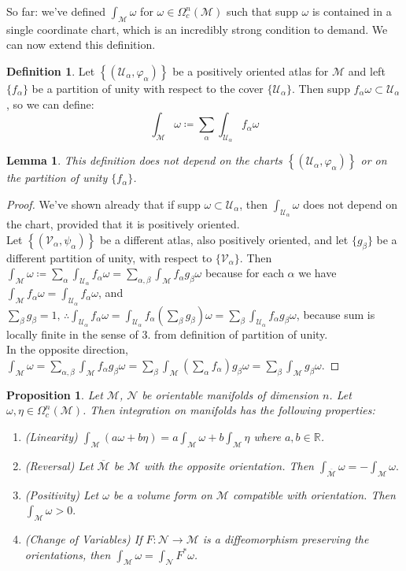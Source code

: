 \documentclass[10pt]{article}
\theoremstyle{plain}
\newtheorem{lemma}[thm]{Lemma}
\newtheorem{prop}[thm]{Proposition}
\theoremstyle{definition}
\newtheorem{defn}[thm]{Definition} %
\newcommand{\Real}{\mathbb{R}}
\newcommand{\man}{\mathcal{M}}
\newcommand{\nan}{\mathcal{N}}
\newcommand{\chartU}{\mathcal{U}}
\newcommand{\chartV}{\mathcal{V}}
\newcommand{\chart}{\varphi}
\newcommand{\varchart}{\psi}
\newcommand{\alphaatlas}{\left\{(\chartU_\alpha,\chart_\alpha)\right\}}
\newcommand{\varalphaatlas}{\left\{(\chartV_\alpha,\varchart_\alpha)\right\}}
\newcommand{\compactpformman}[1]{\Omega^{#1}_c(\man)}
\newcommand{\sumfromto}[2]{\sum\limits_{#1}^{#2}}
\begin{document}
So far: we've defined $\int_\man \omega$ for $\omega \in \compactpformman{n}$ such that supp $\omega$ is contained in a single coordinate chart, which is an incredibly strong condition to demand. We can now extend this definition.
\begin{defn}
Let $\alphaatlas$ be a positively oriented atlas for $\man$ and left $\{f_\alpha\}$ be a partition of unity with respect to the cover $\{\chartU_\alpha\}$. Then supp $f_\alpha \omega \subset  \chartU_\alpha$, so we can define:
$$\int_\man \omega \coloneqq \sumfromto{\alpha}{} \int_{\chartU_\alpha} f_\alpha \omega$$
\end{defn}
\begin{lemma}
This definition does not depend on the charts $\alphaatlas$ or on the partition of unity $\{f_\alpha\}$.
\end{lemma}
\begin{proof}
We've shown already that if supp $\omega \subset \chartU_\alpha$, then $\int_{\chartU_\alpha} \omega$ does not depend on the chart, provided that it is positively oriented. \\
Let $\varalphaatlas$ be a different atlas, also positively oriented, and let $\{g_\beta\}$ be a different partition of unity, with respect to $\{\chartV_\alpha\}$. Then $\int_\man \omega \coloneqq \sumfromto{\alpha}{} \int_{\chartU_\alpha} f_\alpha \omega = \sumfromto{\alpha,\beta}{} \int_{\man} f_\alpha g_\beta \omega$ because for each $\alpha$ we have $\int_\man f_\alpha \omega = \int_{\chartU_\alpha}f_\alpha \omega$, and $\sumfromto{\beta}{} g_\beta = 1, \,\therefore  \int_{\chartU_\alpha}f_\alpha \omega =  \int_{\chartU_\alpha}f_\alpha (\sumfromto{\beta}{}g_\beta)\omega = \sumfromto{\beta}{}\int_{\chartU_\alpha}f_\alpha g_\beta \omega$, because sum is locally finite in the sense of 3. from definition of partition of unity.\\
In the opposite direction, $\int_\man \omega = \sumfromto{\alpha,\beta}{~}  \int_\man f_\alpha g_\beta \omega = \sumfromto{\beta}{} \int_\man (\sumfromto{\alpha}{}f_\alpha )g_\beta \omega = \sumfromto{\beta}{}\int_\man g_\beta \omega$.
\end{proof}
\begin{prop}
Let $\man$, $\nan$ be orientable manifolds of dimension $n$. Let $\omega, \eta \in \compactpformman{n}$. Then integration on manifolds has the following properties:
\begin{enumerate}
    \item (Linearity) $\int_\man (a \omega + b\eta) = a \int_\man \omega  + b \int_\man \eta$ where $a,b \in \Real$.
    \item (Reversal) Let $\overline{\man}$ be $\man$ with the opposite orientation. Then $\int_{\overline{\man}}\omega=-\int_{\man}\omega.$
    \item (Positivity) Let $\omega$ be a volume form on $\man$ compatible with orientation. Then $\int_\man \omega > 0.$
    \item (Change of Variables) If $F : \nan \to \man $ is a diffeomorphism preserving the orientations, then $\int_\man \omega = \int_\nan F^*\omega$.
\end{enumerate}
\end{prop}
\end{document}
